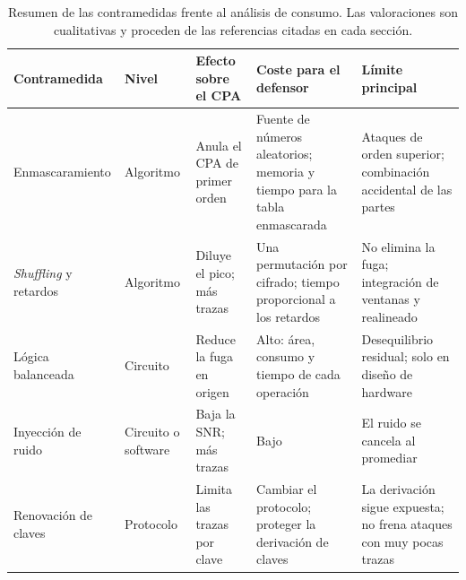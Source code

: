 \begin{table}[htbp]
  \centering
  \caption{Resumen de las contramedidas frente al análisis de consumo. Las
    valoraciones son cualitativas y proceden de las referencias citadas en
    cada sección.}
  \label{tab:mitigaciones}
  \small
  \begin{tabularx}{\textwidth}{>{\raggedright\arraybackslash}p{2.9cm}
                               >{\raggedright\arraybackslash}p{1.8cm}
                               >{\raggedright\arraybackslash}X
                               >{\raggedright\arraybackslash}X
                               >{\raggedright\arraybackslash}X}
    \toprule
    Contramedida & Nivel & Efecto sobre el CPA & Coste para el defensor &
      Límite principal \\
    \midrule
    Enmascaramiento & Algoritmo & Anula el CPA de primer orden &
      Fuente de números aleatorios; memoria y tiempo para la tabla enmascarada &
      Ataques de orden superior; combinación accidental de las partes \\
    \emph{Shuffling} y retardos & Algoritmo & Diluye el pico; más trazas &
      Una permutación por cifrado; tiempo proporcional a los retardos &
      No elimina la fuga; integración de ventanas y realineado \\
    Lógica balanceada & Circuito & Reduce la fuga en origen &
      Alto: área, consumo y tiempo de cada operación &
      Desequilibrio residual; solo en diseño de hardware \\
    Inyección de ruido & Circuito o software & Baja la SNR; más trazas &
      Bajo & El ruido se cancela al promediar \\
    Renovación de claves & Protocolo & Limita las trazas por clave &
      Cambiar el protocolo; proteger la derivación de claves &
      La derivación sigue expuesta; no frena ataques con muy pocas trazas \\
    \bottomrule
  \end{tabularx}
\end{table}
